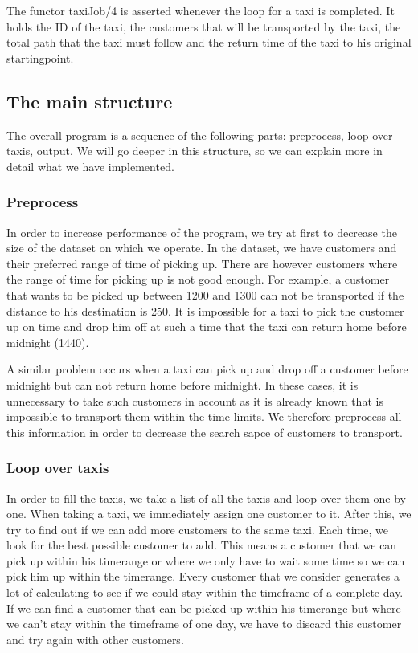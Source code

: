 \documentclass[10pt,a4paper]{article}
\begin{document}
The functor taxiJob/4 is asserted whenever the loop for a taxi is completed. It holds the ID of the taxi, the customers that will be transported by the taxi, the total path that the taxi must follow and the return time of the taxi to his original startingpoint.

\subsection{The main structure}

The overall program is a sequence of the following parts: preprocess, loop over taxis, output. We will go deeper in this structure, so we can explain more in detail what we have implemented.

\subsubsection{Preprocess}

In order to increase performance of the program, we try at first to decrease the size of the dataset on which we operate. In the dataset, we have customers and their preferred range of time of picking up. There are however customers where the range of time for picking up is not good enough. For example, a customer that wants to be picked up between 1200 and 1300 can not be transported if the distance to his destination is 250. It is impossible for a taxi to pick the customer up on time and drop him off at such a time that the taxi can return home before midnight (1440).

A similar problem occurs when a taxi can pick up and drop off a customer before midnight but can not return home before midnight. In these cases, it is unnecessary to take such customers in account as it is already known that is impossible to transport them within the time limits. We therefore preprocess all this information in order to decrease the search sapce of customers to transport.

\subsubsection{Loop over taxis}

In order to fill the taxis, we take a list of all the taxis and loop over them one by one. When taking a taxi, we immediately assign one customer to it. After this, we try to find out if we can add more customers to the same taxi. Each time, we look for the best possible customer to add. This means a customer that we can pick up within his timerange or where we only have to wait some time so we can pick him up within the timerange. Every customer that we consider generates a lot of calculating to see if we could stay within the timeframe of a complete day. If we can find a customer that can be picked up within his timerange but where we can't stay within the timeframe of one day, we have to discard this customer and try again with other customers.
\end{document}
